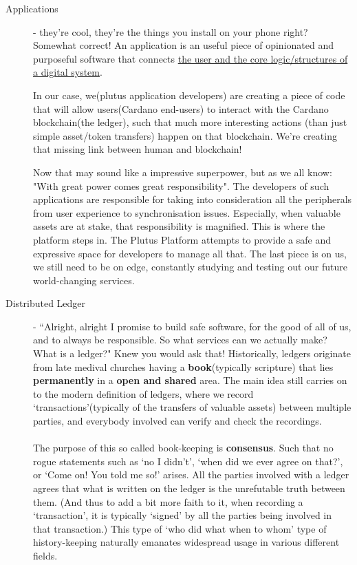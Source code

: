 \documentclass[a4paper, 11pt]{article}
\begin{document}
    \begin{description}
        \item[Applications] - they're cool, they're the things you install on your phone right? Somewhat correct! An application is an useful piece of opinionated and purposeful software that connects \underline{the user and the core logic/structures of a digital system}.
        
        In our case, we(plutus application developers) are creating a piece of code that will allow users(Cardano end-users) to interact with the Cardano blockchain(the ledger), such that much more interesting actions (than just simple asset/token transfers) happen on that blockchain. We're creating that missing link between human and blockchain!
        
        Now that may sound like a impressive superpower, but as we all know: "With great power comes great responsibility". The developers of such applications are responsible for taking into consideration all the peripherals from user experience to synchronisation issues. Especially, when valuable assets are at stake, that responsibility is magnified. This is where the platform steps in. The Plutus Platform attempts to provide a safe and expressive space for developers to manage all that. The last piece is on us, we still need to be on edge, constantly studying and testing out our future world-changing services.

        \item[Distributed Ledger] - ``Alright, alright I promise to build safe software, for the good of all of us, and to always be responsible. So what services can we actually make? What is a ledger?" Knew you would ask that! Historically, ledgers originate from late medival churches having a \textbf{book}(typically scripture) that lies \textbf{permanently} in a \textbf{open and shared} area. The main idea still carries on to the modern definition of ledgers, where we record `transactions'(typically of the transfers of valuable assets) between multiple parties, and everybody involved can verify and check the recordings. 
        
        \paragraph{}The purpose of this so called book-keeping is \textbf{consensus}. Such that no rogue statements such as `no I didn't', `when did we ever agree on that?', or `Come on! You told me so!' arises. All the parties involved with a ledger agrees that what is written on the ledger is the unrefutable truth between them. (And thus to add a bit more faith to it, when recording a `transaction', it is typically `signed' by all the parties being involved in that transaction.) This type of `who did what when to whom' type of history-keeping naturally emanates widespread usage in various different fields. 
        

\end{description}
\end{document}
